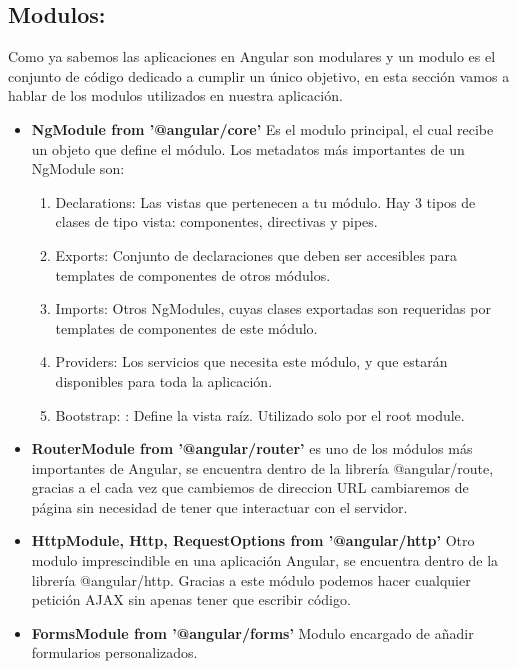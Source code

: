 \subsection{Modulos: } Como ya sabemos las aplicaciones en Angular son modulares y un modulo es el conjunto de código dedicado a cumplir un único objetivo, en esta sección vamos a hablar de los modulos utilizados en nuestra aplicación.
\begin{itemize}
\item \textbf{NgModule from '@angular/core'} Es el modulo principal, el cual recibe un objeto que define el módulo. Los metadatos más importantes de un NgModule son:

\begin{enumerate}
\item{Declarations: } Las vistas que pertenecen a tu módulo. Hay 3 tipos de clases de tipo vista: componentes, directivas y pipes.
\item{Exports: } Conjunto de declaraciones que deben ser accesibles para templates de componentes de otros módulos.

\item{Imports: } Otros NgModules, cuyas clases exportadas son requeridas por templates de componentes de este módulo.

\item{Providers: } Los servicios que necesita este módulo, y que estarán disponibles para toda la aplicación.

\item{Bootstrap: }: Define la vista raíz. Utilizado solo por el root module.
\end{enumerate}

\item \textbf{RouterModule from '@angular/router'} es uno de los módulos más importantes de Angular, se encuentra dentro de la librería @angular/route, gracias a el cada vez que cambiemos de direccion URL cambiaremos de página sin necesidad de tener que interactuar con el servidor.

\item \textbf{ HttpModule, Http, RequestOptions from '@angular/http'} Otro modulo imprescindible en una aplicación Angular, se encuentra dentro de la librería @angular/http. Gracias a este módulo podemos hacer cualquier petición AJAX sin apenas tener que escribir código. 

\item \textbf{ FormsModule from '@angular/forms'} Modulo encargado de añadir formularios personalizados.


\end{itemize}
